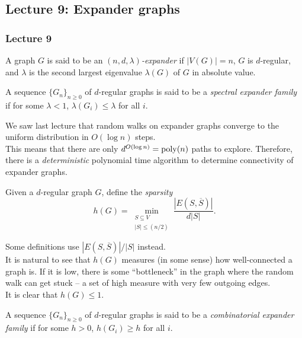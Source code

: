 	\subsection{Lecture 9: Expander graphs}

		\subsubsection{Lecture 9}

			\begin{fdef}
				A graph $G$ is said to be an \emph{$(n,d,\lambda)$-expander} if $|V(G)| = n$, $G$ is $d$-regular, and $\lambda$ is the second largest eigenvalue $\lambda(G)$ of $G$ in absolute value.
			\end{fdef}

			\begin{fdef}
				A sequence $\{G_n\}_{n \ge 0}$ of $d$-regular graphs %
				is said to be a \emph{spectral expander family} if for some $\lambda < 1$, $\lambda(G_i) \le \lambda$ for all $i$.
			\end{fdef}

			We saw last lecture that random walks on expander graphs converge to the uniform distribution in $O(\log n)$ steps.\\
			This means that there are only $d^{O(\log n)} = \operatorname{poly}(n)$ paths to explore. Therefore, there is a \emph{deterministic} polynomial time algorithm to determine connectivity of expander graphs.

			\begin{fdef}[Sparsity]
				Given a $d$-regular graph $G$, define the \emph{sparsity}
				\[ h(G) = \min_{\substack{S \subseteq V \\ |S| \le (n/2)}} \frac{|E(S,\overline{S})|}{d|S|}. \]
			\end{fdef}
			Some definitions use $|E(S,\overline{S})|/|S|$ instead.\\
			It is natural to see that $h(G)$ measures (in some sense) how well-connected a graph is. If it is low, there is some ``bottleneck'' in the graph where the random walk can get stuck -- a set of high measure with very few outgoing edges.\\
			It is clear that $h(G) \le 1$.

			\begin{fdef}
				A sequence $\{G_n\}_{n \ge 0}$ of $d$-regular graphs %
				is said to be a \emph{combinatorial expander family} if for some $h > 0$, $h(G_i) \ge h$ for all $i$.
			\end{fdef}

